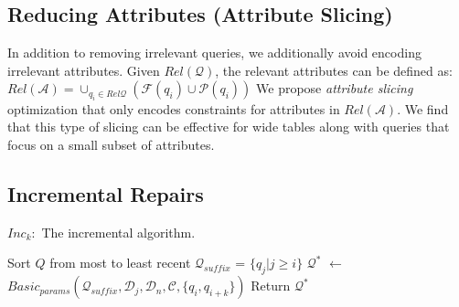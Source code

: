 \subsection{Reducing Attributes (Attribute Slicing)}

In addition to removing irrelevant queries, we additionally avoid encoding irrelevant attributes.
Given $Rel\mathcal{(Q)}$, the relevant attributes can be defined as:
$Rel\mathcal{(A)} = \cup_{q_i \in Rel\mathcal{Q}} (\mathcal{F}(q_i)\cup \mathcal{P}(q_i))$
We propose \emph{attribute slicing} optimization that only encodes constraints for attributes in $Rel\mathcal{(A)}$.
We find that this type of slicing can be effective for wide tables along with queries that focus on a small subset of attributes. 


\subsection{Incremental Repairs}\label{sec:incremental}

\begin{algorithm}[t]
\caption{$Inc_k:$ The incremental algorithm. 
}
\scriptsize
\label{alg:incalg}
\begin{algorithmic}[2]
\STATE Sort $Q$ from most to least recent
  \STATE $\mathcal{Q}_{suffix}$ = $\{q_j | j \ge i \}$ %
  \STATE $\mathcal{Q}^*$ $\leftarrow$ $Basic_{params}(\mathcal{Q}_{suffix}, \mathcal{D}_j, \mathcal{D}_n, \mathcal{C}, \{q_i, q_{i+k}\})$
    \STATE Return $\mathcal{Q}^*$
  \ENDIF
\ENDFOR
\end{algorithmic}
\end{algorithm}

